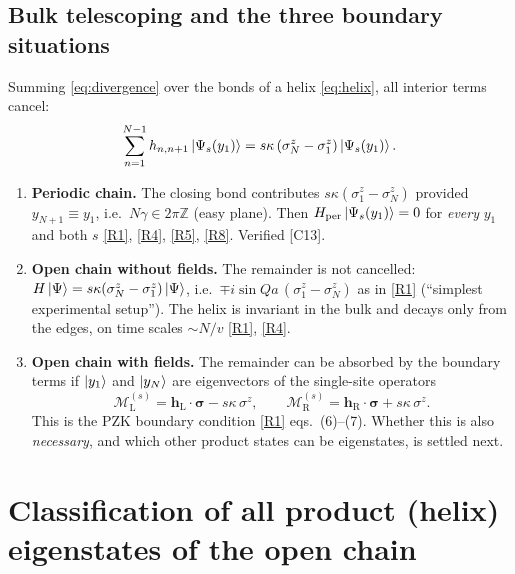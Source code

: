 \documentclass[11pt,a4paper]{article}
\theoremstyle{definition}
\newcommand{\hL}{\mathbf h_{\mathrm L}}
\newcommand{\hR}{\mathbf h_{\mathrm R}}
\newcommand{\bsig}{\boldsymbol\sigma}
\newcommand{\ML}[1][s]{\mathcal M_{\mathrm L}^{(#1)}}
\newcommand{\MR}[1][s]{\mathcal M_{\mathrm R}^{(#1)}}
\newcommand{\ver}[1]{\textsf{[#1]}}   %
\begin{document}
\subsection{Bulk telescoping and the three boundary situations}
Summing \eqref{eq:divergence} over the bonds of a helix \eqref{eq:helix}, all interior terms cancel:
\begin{equation}\label{eq:telescoping}
\sum_{n=1}^{N-1}h_{n,n+1}\ket{\Psi_s(y_1)}=s\kappa\left(\sigma^z_N-\sigma^z_1\right)\ket{\Psi_s(y_1)}.
\end{equation}
\begin{enumerate}[label=(\alph*)]
\item \textbf{Periodic chain.} The closing bond contributes $s\kappa(\sigma^z_1-\sigma^z_N)$ provided $y_{N+1}\equiv y_1$, i.e.\ $N\gamma\in2\pi\mathbb Z$ (easy plane). Then $H_{\rm per}\ket{\Psi_s(y_1)}=0$ for \emph{every} $y_1$ and both $s$ \ref{R1}, \ref{R4}, \ref{R5}, \ref{R8}. Verified \ver{C13}.
\item \textbf{Open chain without fields.} The remainder is not cancelled: $H\ket{\Psi}=s\kappa(\sigma^z_N-\sigma^z_1)\ket\Psi$, i.e.\ $\mp i\sin Qa\,(\sigma^z_1-\sigma^z_N)$ as in \ref{R1} (``simplest experimental setup''). The helix is invariant in the bulk and decays only from the edges, on time scales $\sim N/v$ \ref{R1}, \ref{R4}.
\item \textbf{Open chain with fields.} The remainder can be absorbed by the boundary terms if $\ket{y_1}$ and $\ket{y_N}$ are eigenvectors of the single-site operators
\begin{equation}\label{eq:Mops}
\ML=\hL\cdot\bsig-s\kappa\,\sigma^z,\qquad \MR=\hR\cdot\bsig+s\kappa\,\sigma^z .
\end{equation}
This is the PZK boundary condition \ref{R1} eqs.~(6)--(7). Whether this is also \emph{necessary}, and which other product states can be eigenstates, is settled next.
\end{enumerate}

\section{Classification of all product (helix) eigenstates of the open chain}\label{sec:classification}
\end{document}
